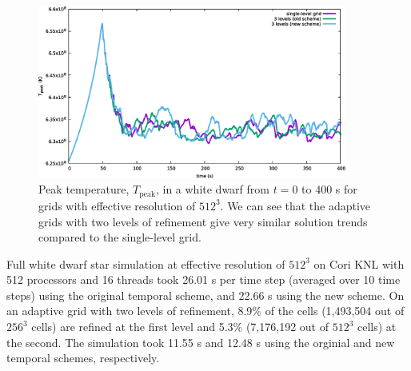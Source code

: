 \begin{figure}[htb]
\begin{center}
\includegraphics[width=4.0in]{./figs/wdconvect_amr_Tmax} 
\caption{\label{fig:wdconvect_amr_Tmax} Peak temperature, $T_{\text{peak}}$, in a white dwarf from $t=0$ to $400$ s 
         for grids with effective resolution of $512^3$. We can see that the adaptive grids with two levels of 
         refinement give very similar solution trends compared to the single-level grid.}
\end{center}
\end{figure}

Full white dwarf star simulation at effective resolution of $512^3$ on Cori KNL with 512 processors and 16 threads took 26.01 s per time step (averaged over 10 time steps) using the original temporal scheme, and 22.66 s using the new scheme. On an adaptive grid with two levels of refinement, 8.9\% of the cells (1,493,504 out of $256^3$ cells) are refined at the first level and 5.3\% (7,176,192 out of $512^3$ cells) at the second. The simulation took 11.55 s and 12.48 s using the orginial and new temporal schemes, respectively. 
